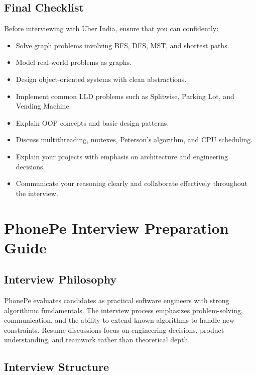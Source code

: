 \documentclass[11pt,a4paper]{article}
\begin{document}

\subsection{Final Checklist}

Before interviewing with Uber India, ensure that you can confidently:

\begin{itemize}
	\item Solve graph problems involving BFS, DFS, MST, and shortest paths.
	\item Model real-world problems as graphs.
	\item Design object-oriented systems with clean abstractions.
	\item Implement common LLD problems such as Splitwise, Parking Lot, and Vending Machine.
	\item Explain OOP concepts and basic design patterns.
	\item Discuss multithreading, mutexes, Peterson's algorithm, and CPU scheduling.
	\item Explain your projects with emphasis on architecture and engineering decisions.
	\item Communicate your reasoning clearly and collaborate effectively throughout the interview.
\end{itemize}

\section{PhonePe Interview Preparation Guide}

\subsection{Interview Philosophy}

PhonePe evaluates candidates as practical software engineers with strong algorithmic fundamentals. The interview process emphasizes problem-solving, communication, and the ability to extend known algorithms to handle new constraints. Resume discussions focus on engineering decisions, product understanding, and teamwork rather than theoretical depth.


\subsection{Interview Structure}
\end{document}
